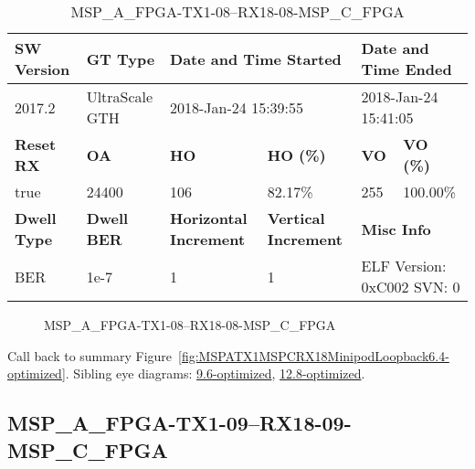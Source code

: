 \begin{table}[h]
\centering
\caption{MSP\_A\_FPGA-TX1-08--RX18-08-MSP\_C\_FPGA}
\label{tab:MSPAFPGATX108RX1808MSPCFPGA6.4-optimized}
\begin{tabular}{@{}|l|l|l|l|l|l|@{}}
\toprule
\textbf{SW Version}                & \textbf{GT Type}   & \multicolumn{2}{l|}{\textbf{Date and Time Started}}            & \multicolumn{2}{l|}{\textbf{Date and Time Ended}}        \\ \midrule
2017.2                       & UltraScale GTH          & \multicolumn{2}{l|}{2018-Jan-24 15:39:55}                   & \multicolumn{2}{l|}{2018-Jan-24 15:41:05}               \\ \midrule
\textbf{Reset RX}                  & \textbf{OA} & \textbf{HO}   & \textbf{HO (\%)} & \textbf{VO} & \textbf{VO (\%)} \\ \midrule
true & 24400        & 106          & 82.17\%        & 255        & 100.00\%       \\ \midrule
\textbf{Dwell Type}                & \textbf{Dwell BER} & \textbf{Horizontal Increment} & \textbf{Vertical Increment}    & \multicolumn{2}{l|}{\textbf{Misc Info}}                  \\ \midrule
BER                            & 1e-7        & 1        & 1           & \multicolumn{2}{l|}{ELF Version: 0xC002 SVN: 0}                         \\ \bottomrule
\end{tabular}
\end{table}

\begin{figure}[h]
\caption{MSP\_A\_FPGA-TX1-08--RX18-08-MSP\_C\_FPGA} \label{fig:MSPAFPGATX108RX1808MSPCFPGA6.4-optimized}
\end{figure}

Call back to summary Figure~\ref{fig:MSPATX1MSPCRX18MinipodLoopback6.4-optimized}.
Sibling eye diagrams: \hyperref[sec:MSPAFPGATX108RX1808MSPCFPGA9.6-optimized]{9.6-optimized}, \hyperref[sec:MSPAFPGATX108RX1808MSPCFPGA12.8-optimized]{12.8-optimized}.

\clearpage
\newpage


\subsection{MSP\_A\_FPGA-TX1-09--RX18-09-MSP\_C\_FPGA}\label{sec:MSPAFPGATX109RX1809MSPCFPGA6.4-optimized}

